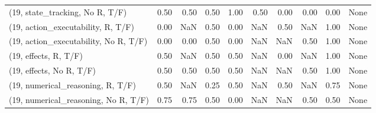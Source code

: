 \begin{table*}[h!]
\begin{adjustbox}{width=2\columnwidth,center}
\begin{tabular}{lrrr|rrr|rrr}
(19, state\_tracking, No R, T/F)       &                      0.50 &                  0.50 &                      0.50 &                          1.00 &                      0.50 &                          0.00 &                                   0.00 &                               0.00 &                                  None \\
(19, action\_executability, R, T/F)    &                      0.00 &                   NaN &                      0.50 &                          0.00 &                       NaN &                          0.50 &                                    NaN &                               1.00 &                                  None \\
(19, action\_executability, No R, T/F) &                      0.00 &                  0.00 &                      0.50 &                          0.00 &                       NaN &                           NaN &                                   0.50 &                               1.00 &                                  None \\
(19, effects, R, T/F)                 &                      0.50 &                   NaN &                      0.50 &                          0.50 &                       NaN &                          0.00 &                                    NaN &                               1.00 &                                  None \\
(19, effects, No R, T/F)              &                      0.50 &                  0.50 &                      0.50 &                          0.50 &                       NaN &                           NaN &                                   0.50 &                               1.00 &                                  None \\
(19, numerical\_reasoning, R, T/F)     &                      0.50 &                   NaN &                      0.25 &                          0.50 &                       NaN &                          0.50 &                                    NaN &                               0.75 &                                  None \\
(19, numerical\_reasoning, No R, T/F)  &                      0.75 &                  0.75 &                      0.50 &                          0.00 &                       NaN &                           NaN &                                   0.50 &                               0.50 &                                  None \\

\end{tabular}
\end{adjustbox}
\end{table*}
